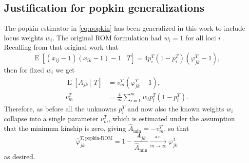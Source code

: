 \documentclass[9pt,twocolumn,twoside]{gsajnl}
\newcommand{\xij}[1][j]{x_{i#1}}
\newcommand{\pit}{p_i^T}
\newcommand{\kt}[1][k]{\varphi_{j#1}^T}
\newcommand{\ktHatNamed}[2][k]{\hat{\varphi}_{j#1}^{T,\text{#2}}}
\newcommand{\Ajk}[1][k]{A_{j#1}}
\newcommand{\AMinHat}{\hat{A}_{\text{min}}}
\newcommand{\toas}{\xrightarrow[m \rightarrow \infty]{\text{a.s.}}}
\DeclareMathOperator{\E}{E}
\begin{document}
\begin{appendices}
  \appendix

  \setcounter{secnumdepth}{1}
  
  \appendixpage
  
  \section{Justification for popkin generalizations}

  \label{sec:popkin_w_justif}

  The popkin estimator in \cref{eq:popkin} has been generalized in this work to include locus weights $w_i$.
  The original ROM formulation had $w_i=1$ for all loci $i$ \citep{ochoa_estimating_2021}.
  Recalling from that original work that
  $$
  \E \left[ (\xij-1)(\xij[k]-1) - 1 \middle| T \right]
  =
  4 \pit \left( 1 - \pit \right) \left( \kt - 1 \right),
  $$
  then for fixed $w_i$ we get
  \begin{align*}
    \E \left[ \Ajk \middle| T \right]
    &=
      v_m^T \left( \kt - 1 \right)
      , \\
    v_m^T
    &=
      \frac{4}{m} \sum_{i=1}^m w_i \pit \left( 1 - \pit \right)
      .
  \end{align*}
  Therefore, as before all the unknowns $\pit$ and now also the known weights $w_i$ collapse into a single parameter $v_m^T$, which is estimated under the assumption that the minimum kinship is zero, giving $\AMinHat = -v_m^T$, so that
  $$
  \ktHatNamed{popkin-ROM}
  =
  1 - \frac{\Ajk}{\AMinHat}
  \toas
  \kt
  $$
  as desired.


\end{appendices}
\end{document}
